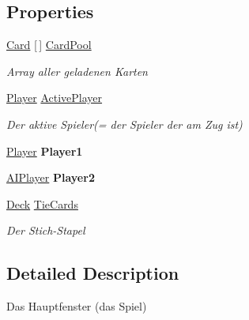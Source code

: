 \subsection*{Properties}
\begin{DoxyCompactItemize}
\item 
\mbox{\hyperlink{class_poke_quet_1_1_card}{Card}} \mbox{[}$\,$\mbox{]} \mbox{\hyperlink{class_main_window_ae1c30b48118e2c8c6cd16171fab0cd31}{Card\+Pool}}
\begin{DoxyCompactList}\small\item\em Array aller geladenen Karten \end{DoxyCompactList}\item 
\mbox{\hyperlink{class_poke_quet_1_1_player}{Player}} \mbox{\hyperlink{class_main_window_a4ce463cb4e7d116640b55416557ea741}{Active\+Player}}
\begin{DoxyCompactList}\small\item\em Der aktive Spieler(= der Spieler der am Zug ist) \end{DoxyCompactList}\item 
\mbox{\label{class_main_window_a49ed88cd1ccd49cb4489fd432ac6efa5}} 
\mbox{\hyperlink{class_poke_quet_1_1_player}{Player}} {\bfseries Player1}
\item 
\mbox{\label{class_main_window_aed5200384ee8a791a584c07ae034b0d6}} 
\mbox{\hyperlink{class_poke_quet_1_1_a_i_player}{A\+I\+Player}} {\bfseries Player2}
\item 
\mbox{\hyperlink{class_poke_quet_1_1_deck}{Deck}} \mbox{\hyperlink{class_main_window_a71f4eaa448a91297c8c54786e5c0516e}{Tie\+Cards}}
\begin{DoxyCompactList}\small\item\em Der Stich-\/\+Stapel \end{DoxyCompactList}\end{DoxyCompactItemize}


\subsection{Detailed Description}
Das Hauptfenster (das Spiel) 



